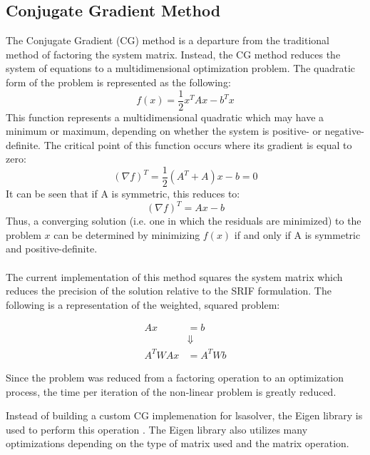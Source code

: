 \subsection{Conjugate Gradient Method}
The Conjugate Gradient (CG) method is a departure from the traditional
method of factoring the system matrix. Instead, the CG method reduces
the system of equations to a multidimensional optimization problem. The quadratic
form of the problem is represented as the following:
\begin{equation}
f(x) = \frac{1}{2}x^TAx - b^Tx
\end{equation}
This function represents a multidimensional quadratic which may have
a minimum or maximum, depending on whether the system is positive- 
or negative-definite. The critical point of this function occurs where
its gradient is equal to zero:
\begin{equation}
(\nabla f)^T = \frac{1}{2}(A^T + A)x - b = 0
\end{equation}
It can be seen that if A is symmetric, this reduces to:
\begin{equation}
(\nabla f)^T = Ax - b
\end{equation}
Thus, a converging solution (i.e. one in which the residuals are minimized) to the problem $x$ can be determined by minimizing $f(x)$ if and
only if A is symmetric and positive-definite. \\ \\
The current implementation of this method squares the system matrix which
reduces the precision of the solution relative to the SRIF formulation.
The following is a representation of the weighted, squared problem:

\begin{equation}
\begin{split}
Ax &= b \\
& \Downarrow \\ 
A^TWAx &= A^TWb
\end{split}
\end{equation}

Since the problem was reduced from a factoring operation to an optimization
process, the time per iteration of the non-linear problem is greatly reduced.

Instead of building a custom CG implemenation for \textsf{lsasolver},
the Eigen library is used to perform this operation \cite{eigenweb}. The 
Eigen library also utilizes many optimizations depending on the
type of matrix used and the matrix operation.

